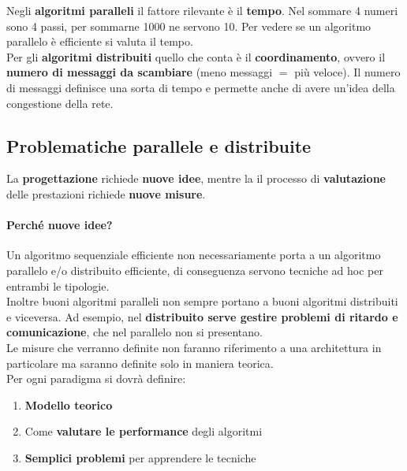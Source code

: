 Negli \textbf{algoritmi paralleli} il fattore rilevante è il \textbf{tempo}. Nel sommare 4 numeri sono 4 passi, per sommarne 1000 ne servono 10. Per vedere se un algoritmo parallelo è efficiente si valuta il tempo. \\

Per gli \textbf{algoritmi distribuiti} quello che conta è il \textbf{coordinamento}, ovvero il \textbf{numero di messaggi da scambiare} (meno messaggi $=$ più veloce). Il numero di messaggi definisce una sorta di tempo e permette anche di avere un'idea della congestione della rete. \\


\subsection*{Problematiche parallele e distribuite}

La \textbf{progettazione} richiede \textbf{nuove idee}, mentre la il processo di \textbf{valutazione} delle prestazioni richiede \textbf{nuove misure}.\\

\paragraph{Perché nuove idee?} Un algoritmo sequenziale efficiente non necessariamente porta a un algoritmo parallelo e/o distribuito efficiente, di conseguenza servono tecniche ad hoc per entrambi le tipologie.\\

Inoltre buoni algoritmi paralleli non sempre portano a buoni algoritmi distribuiti e viceversa. Ad esempio, nel \textbf{distribuito serve gestire problemi di ritardo e comunicazione}, che nel parallelo non si presentano.\\

Le misure che verranno definite non faranno riferimento a una architettura in particolare ma saranno definite solo in maniera teorica.\\

Per ogni paradigma si dovrà definire: 
\begin{enumerate}
	\item \textbf{Modello teorico}
	\item Come \textbf{valutare le performance} degli algoritmi
	\item \textbf{Semplici problemi} per apprendere le tecniche
\end{enumerate}

